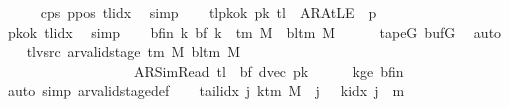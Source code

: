 \begin{isabellebody}
\ \ \ \ \isamarkupfalse%
\ c{}{\isacharunderscore}{\kern0pt}ps\ ppos\ tlidx\ \isamarkupfalse%
\ simp\isanewline
\ \ \isamarkupfalse%
\ tl{\isacharunderscore}{\kern0pt}pkok{\isacharcolon}{\kern0pt}\ {\isachardoublequoteopen}{\isacharquery}{\kern0pt}pk\ {\isacharquery}{\kern0pt}tl\ {\isacharequal}{\kern0pt}\ AR{\isacharunderscore}{\kern0pt}AtLE\ {\isasymlongleftrightarrow}\ {\isacharquery}{\kern0pt}p\ {\isacharequal}{\kern0pt}\ {}{\isachardoublequoteclose}\isanewline
\ \ \ \ \isamarkupfalse%
\ pkok\ tlidx\ \isamarkupfalse%
\ simp\isanewline
\ \ \isamarkupfalse%
\ bf{\isacharunderscore}{\kern0pt}in{\isacharcolon}{\kern0pt}\ {\isachardoublequoteopen}{\isasymAnd}k{\isachardot}{\kern0pt}\ {\isacharquery}{\kern0pt}bf\ k\ {\isasymin}\ {\isasymGamma}{\isacharunderscore}{\kern0pt}tm\ M\ {\isasymunion}\ {\isacharbraceleft}{\kern0pt}bl{\isacharunderscore}{\kern0pt}tm\ M{\isacharbraceright}{\kern0pt}{\isachardoublequoteclose}\isanewline
\ \ \ \ \isamarkupfalse%
\ tapeG\ bufG\ \isamarkupfalse%
\ auto\isanewline
\ \ \isamarkupfalse%
\ tl{\isacharunderscore}{\kern0pt}vsrc{\isacharcolon}{\kern0pt}\ {\isachardoublequoteopen}ar{\isacharunderscore}{\kern0pt}valid{\isacharunderscore}{\kern0pt}stage\ {\isacharparenleft}{\kern0pt}{\isasymGamma}{\isacharunderscore}{\kern0pt}tm\ M{\isacharparenright}{\kern0pt}\ {\isacharparenleft}{\kern0pt}bl{\isacharunderscore}{\kern0pt}tm\ M{\isacharparenright}{\kern0pt}\isanewline
\ \ \ \ \ \ \ \ \ \ \ \ \ \ \ \ \ \ \ {\isacharparenleft}{\kern0pt}AR{\isacharunderscore}{\kern0pt}SimRead{\isacharcomma}{\kern0pt}\ {\isacharquery}{\kern0pt}tl{\isacharcomma}{\kern0pt}\ {}{\isacharcomma}{\kern0pt}\ {\isacharquery}{\kern0pt}bf{\isacharcomma}{\kern0pt}\ dvec{\isacharcomma}{\kern0pt}\ {\isacharquery}{\kern0pt}pk{\isacharparenright}{\kern0pt}{\isachardoublequoteclose}\isanewline
\ \ \ \ \isamarkupfalse%
\ kge{}\ bf{\isacharunderscore}{\kern0pt}in\ \isamarkupfalse%
\ {\isacharparenleft}{\kern0pt}auto\ simp{\isacharcolon}{\kern0pt}\ ar{\isacharunderscore}{\kern0pt}valid{\isacharunderscore}{\kern0pt}stage{\isacharunderscore}{\kern0pt}def{\isacharparenright}{\kern0pt}\isanewline
\ \ \isamarkupfalse%
\ tail{\isacharunderscore}{\kern0pt}idx{\isacharcolon}{\kern0pt}\ {\isachardoublequoteopen}{\isasymAnd}j{\isachardot}{\kern0pt}\ k{\isacharunderscore}{\kern0pt}tm\ M\ {\isasymle}\ j\ {\isasymLongrightarrow}\ {\isasymnot}\ k{\isacharunderscore}{\kern0pt}idx\ j\ {\isacharless}{\kern0pt}\ {\isacharquery}{\kern0pt}m{}{\isachardoublequoteclose}\isanewline

\end{isabellebody}
